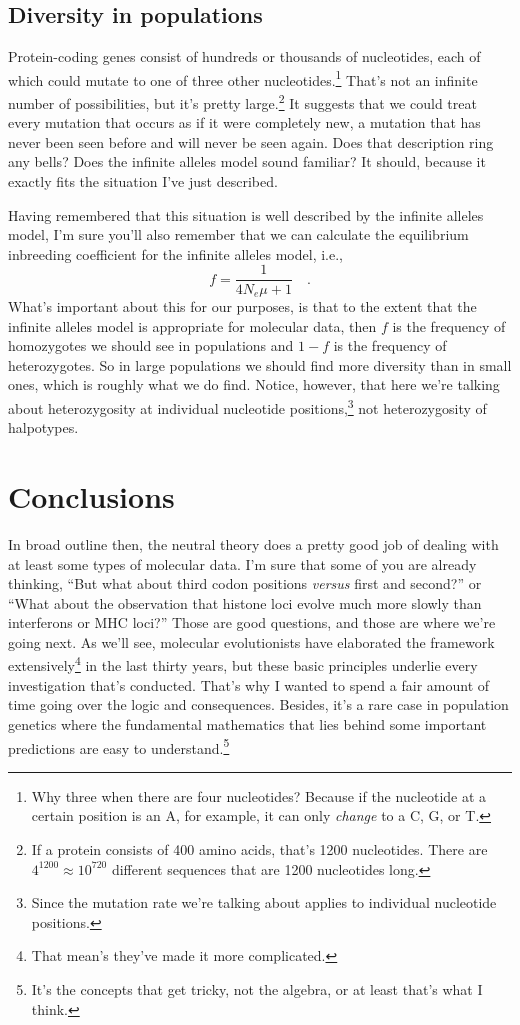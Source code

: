 \subsection*{Diversity in populations}

Protein-coding genes consist of hundreds or thousands of nucleotides,
each of which could mutate to one of three other
nucleotides.\footnote{Why three when there are four nucleotides?
  Because if the nucleotide at a certain position is an A, for
  example, it can only {\it change\/} to a C, G, or T.} That's not an
infinite number of possibilities, but it's pretty large.\footnote{If a
  protein consists of 400 amino acids, that's 1200 nucleotides. There
  are $4^{1200} \approx 10^{720}$ different sequences that are 1200
  nucleotides long.} It suggests that we could treat every mutation
that occurs as if it were completely new, a mutation that has never
been seen before and will never be seen again. Does that description
ring any bells? Does the infinite alleles model sound familiar? It
should, because it exactly fits the situation I've just
described.

Having remembered that this situation is well described by the
infinite alleles model, I'm sure you'll also remember that we can
calculate the equilibrium inbreeding coefficient for the infinite
alleles model, i.e.,
\[
f = \frac{1}{4N_e\mu + 1} \quad .
\]
What's important about this for our purposes, is that to the extent
that the infinite alleles model is appropriate for molecular data,
then $f$ is the frequency of homozygotes we should see in populations
and $1-f$ is the frequency of heterozygotes. So in large populations
we should find more diversity than in small ones, which is roughly
what we do find. Notice, however, that here we're talking about
heterozygosity at individual nucleotide positions,\footnote{Since the
  mutation rate we're talking about applies to individual nucleotide
  positions.} not heterozygosity of halpotypes.

\section*{Conclusions}

In broad outline then, the neutral theory does a pretty good job of
dealing with at least some types of molecular data. I'm sure that some
of you are already thinking, ``But what about third codon positions
{\it versus\/} first and second?'' or ``What about the observation
that histone loci evolve much more slowly than interferons or MHC
loci?''  Those are good questions, and those are where we're going
next. As we'll see, molecular evolutionists have elaborated the
framework extensively\footnote{That mean's they've made it more
  complicated.} in the last thirty years, but these basic principles
underlie every investigation that's conducted. That's why I wanted to
spend a fair amount of time going over the logic and
consequences. Besides, it's a rare case in population genetics where
the fundamental mathematics that lies behind some important
predictions are easy to understand.\footnote{It's the concepts that
  get tricky, not the algebra, or at least that's what I think.}

